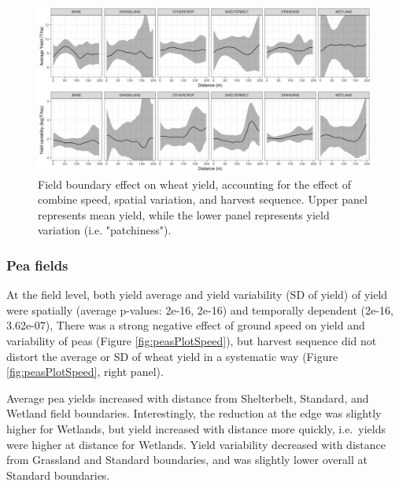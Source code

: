 \documentclass[]{elsarticle} %
\begin{document}
\begin{figure}
\includegraphics[width=1\linewidth]{../Figures/ModelSummary3a_wheat} \caption{Field boundary effect on wheat yield, accounting for the effect of combine speed, spatial variation, and harvest sequence. Upper panel represents mean yield, while the lower panel represents yield variation (i.e. "patchiness").}\label{fig:wheatPlot}
\end{figure}

\hypertarget{pea-fields}{%
\subsubsection{Pea fields}\label{pea-fields}}

At the field level, both yield average and yield variability (SD of yield) of yield were spatially (average p-values: 2e-16, 2e-16) and temporally dependent (2e-16, 3.62e-07),
There was a strong negative effect of ground speed on yield and variability of peas (Figure \ref{fig:peasPlotSpeed}), but harvest sequence did not distort the average or SD of wheat yield in a systematic way (Figure \ref{fig:peasPlotSpeed}, right panel).

Average pea yields increased with distance from Shelterbelt, Standard, and Wetland field boundaries.
Interestingly, the reduction at the edge was slightly higher for Wetlands, but yield increased with distance more quickly, i.e.~yields were higher at distance for Wetlands.
Yield variability decreased with distance from Grassland and Standard boundaries, and was slightly lower overall at Standard boundaries.
\end{document}
